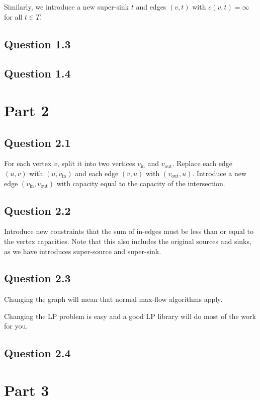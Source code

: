 \documentclass{sig-alternate}
\begin{document}
Similarly, we introduce a new super-sink $t$ and edges $(v, t)$ with
$c(v,t)=\infty$ for all $t \in T$.


\subsection*{Question 1.3}

\subsection*{Question 1.4}



\section{Part 2}
\subsection*{Question 2.1}
For each vertex $v$, split it into two vertices $v_{\text{in}}$ and
$v_{\text{out}}$. Replace each edge $(u, v)$ with $(u, v_{\text{in}})$
and each edge $(v, u)$ with $(v_{\text{out}}, u)$. Introduce a new edge
$(v_{\text{in}}, v_{\text{out}})$ with capacity equal to the capacity of
the intersection.

\subsection*{Question 2.2}
Introduce new constraints that the sum of in-edges must be less than or equal
to the vertex capacities. Note that this also includes the original sources and
sinks, as we have introduces super-source and super-sink.

\subsection*{Question 2.3}
Changing the graph will mean that normal max-flow algorithms apply.

Changing the LP problem is easy and a good LP library will do most of the
work for you.

\subsection*{Question 2.4}

\section{Part 3}


\end{document}

